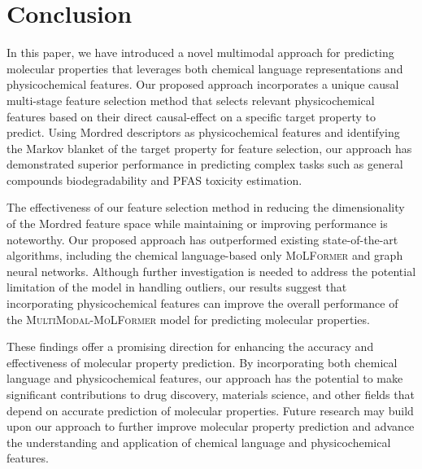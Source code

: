 \documentclass{article}
\begin{document}
\section{Conclusion}

In this paper, we have introduced a novel multimodal approach for predicting molecular properties that leverages both chemical language representations and physicochemical features. Our proposed approach incorporates a unique causal multi-stage feature selection method that selects relevant physicochemical features based on their direct causal-effect on a specific target property to predict. Using Mordred descriptors as physicochemical features and identifying the Markov blanket of the target property for feature selection, our approach has demonstrated superior performance in predicting complex tasks such as general compounds biodegradability and PFAS toxicity estimation.

The effectiveness of our feature selection method in reducing the dimensionality of the Mordred feature space while maintaining or improving performance is noteworthy. Our proposed approach has outperformed existing state-of-the-art algorithms, including the chemical language-based only \textsc{MoLFormer} and graph neural networks. Although further investigation is needed to address the potential limitation of the model in handling outliers, our results suggest that incorporating physicochemical features can improve the overall performance of the \textsc{MultiModal}-\textsc{MoLFormer} model for predicting molecular properties.

These findings offer a promising direction for enhancing the accuracy and effectiveness of molecular property prediction. By incorporating both chemical language and physicochemical features, our approach has the potential to make significant contributions to drug discovery, materials science, and other fields that depend on accurate prediction of molecular properties. Future research may build upon our approach to further improve molecular property prediction and advance the understanding and application of chemical language and physicochemical features.



\footnotesize






\end{document}

